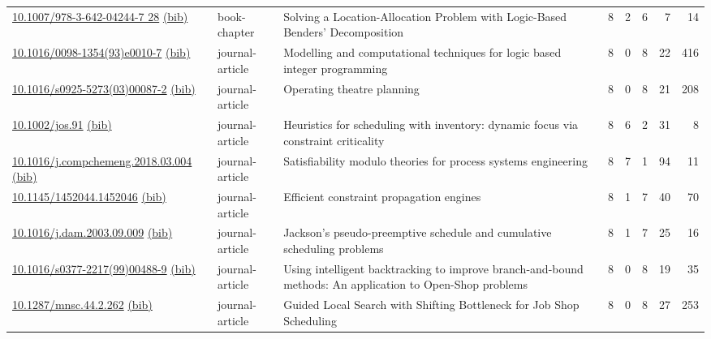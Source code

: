 {\begin{longtable}{p{5cm}lp{11cm}rrrrr}
\href{http://dx.doi.org/10.1007/978-3-642-04244-7_28}{10.1007/978-3-642-04244-7 28} \href{https://www.doi2bib.org/bib/10.1007/978-3-642-04244-7_28}{(bib)} & book-chapter & Solving a Location-Allocation Problem with Logic-Based Benders' Decomposition & 8 & 2 & 6 & 7 & 14 \\
\href{http://dx.doi.org/10.1016/0098-1354(93)e0010-7}{10.1016/0098-1354(93)e0010-7} \href{https://www.doi2bib.org/bib/10.1016/0098-1354(93)e0010-7}{(bib)} & journal-article & Modelling and computational techniques for logic based integer programming & 8 & 0 & 8 & 22 & 416 \\
\href{http://dx.doi.org/10.1016/s0925-5273(03)00087-2}{10.1016/s0925-5273(03)00087-2} \href{https://www.doi2bib.org/bib/10.1016/s0925-5273(03)00087-2}{(bib)} & journal-article & Operating theatre planning & 8 & 0 & 8 & 21 & 208 \\
\href{http://dx.doi.org/10.1002/jos.91}{10.1002/jos.91} \href{https://www.doi2bib.org/bib/10.1002/jos.91}{(bib)} & journal-article & Heuristics for scheduling with inventory: dynamic focus via constraint criticality & 8 & 6 & 2 & 31 & 8 \\
\href{http://dx.doi.org/10.1016/j.compchemeng.2018.03.004}{10.1016/j.compchemeng.2018.03.004} \href{https://www.doi2bib.org/bib/10.1016/j.compchemeng.2018.03.004}{(bib)} & journal-article & Satisfiability modulo theories for process systems engineering & 8 & 7 & 1 & 94 & 11 \\
\href{http://dx.doi.org/10.1145/1452044.1452046}{10.1145/1452044.1452046} \href{https://www.doi2bib.org/bib/10.1145/1452044.1452046}{(bib)} & journal-article & Efficient constraint propagation engines & 8 & 1 & 7 & 40 & 70 \\
\href{http://dx.doi.org/10.1016/j.dam.2003.09.009}{10.1016/j.dam.2003.09.009} \href{https://www.doi2bib.org/bib/10.1016/j.dam.2003.09.009}{(bib)} & journal-article & Jackson's pseudo-preemptive schedule and cumulative scheduling problems & 8 & 1 & 7 & 25 & 16 \\
\href{http://dx.doi.org/10.1016/s0377-2217(99)00488-9}{10.1016/s0377-2217(99)00488-9} \href{https://www.doi2bib.org/bib/10.1016/s0377-2217(99)00488-9}{(bib)} & journal-article & Using intelligent backtracking to improve branch-and-bound methods: An application to Open-Shop problems & 8 & 0 & 8 & 19 & 35 \\
\href{http://dx.doi.org/10.1287/mnsc.44.2.262}{10.1287/mnsc.44.2.262} \href{https://www.doi2bib.org/bib/10.1287/mnsc.44.2.262}{(bib)} & journal-article & Guided Local Search with Shifting Bottleneck for Job Shop Scheduling & 8 & 0 & 8 & 27 & 253 \\

\end{longtable}}
